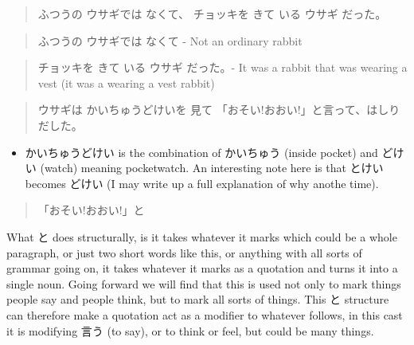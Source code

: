 \documentclass[11pt]{article}
\begin{document}
\begin{quote}
ふつうの ウサギでは なくて、 チョッキを きて いる ウサギ だった。
\end{quote}
\begin{quote}
ふつうの ウサギでは なくて - Not an ordinary rabbit
\end{quote}

\begin{quote}
チョッキを きて いる ウサギ だった。- It was a rabbit that was wearing a vest (it was a wearing a vest rabbit)
\end{quote}


\begin{quote}
ウサギは かいちゅうどけいを 見て 「おそい!おおい!」と言って、はしり だした。
\end{quote}
\begin{itemize}
\item かいちゅうどけい is the combination of かいちゅう (inside pocket) and どけい (watch) meaning pocketwatch. An interesting note here is that とけい becomes どけい (I may write up a full explanation of why anothe time).
\end{itemize}

\begin{quote}
「おそい!おおい!」と
\end{quote}
What と does structurally, is it takes whatever it marks which could be a whole paragraph, or just two short words like this, or anything with all sorts of grammar going on, it takes whatever it marks as a quotation and turns it into a single noun. Going forward we will find that this is used not only to mark things people say and people think, but to mark all sorts of things. This と structure can therefore make a quotation act as a modifier to whatever follows, in this cast it is modifying 言う (to say), or to think or feel, but could be many things.
\end{document}
